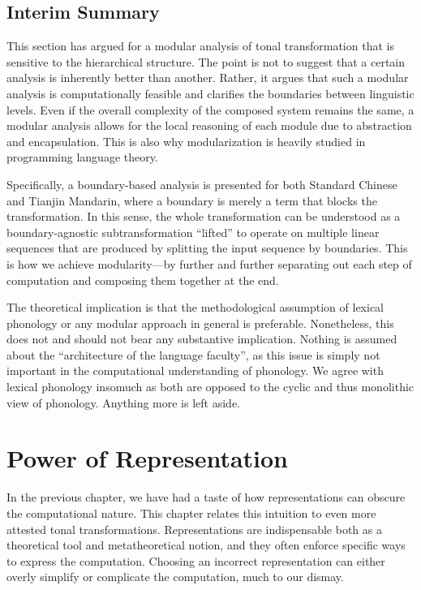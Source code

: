 \documentclass[12pt, a4paper]{report}
\begin{document}
\section{Interim Summary}
This section has argued for a modular analysis of tonal transformation
that is sensitive to the hierarchical structure.  The point is not to
suggest that a certain analysis is inherently better than another.
Rather, it argues that such a modular analysis is computationally
feasible and clarifies the boundaries between linguistic levels.  Even
if the overall complexity of the composed system remains the same, a
modular analysis allows for the local reasoning of each module due to
abstraction and encapsulation.  This is also why modularization is
heavily studied in programming language theory.

Specifically, a boundary-based analysis is presented for both Standard
Chinese and Tianjin Mandarin, where a boundary is merely a term that
blocks the transformation.  In this sense, the whole transformation
can be understood as a boundary-agnostic subtransformation
\enquote{lifted} to operate on multiple linear sequences that are
produced by splitting the input sequence by boundaries.  This is how we
achieve modularity---by further and further separating out each step
of computation and composing them together at the end.

The theoretical implication is that the methodological assumption of
lexical phonology or any modular approach in general is preferable.
Nonetheless, this does not and should not bear any substantive
implication.  Nothing is assumed about the \enquote{architecture of
  the language faculty}, as this issue is simply not important in the
computational understanding of phonology.  We agree with lexical
phonology insomuch as both are opposed to the cyclic and thus
monolithic view of phonology.  Anything more is left aside.

\chapter{Power of Representation}
In the previous chapter, we have had a taste of how representations
can obscure the computational nature.  This chapter relates this
intuition to even more attested tonal transformations.
Representations are indispensable both as a theoretical tool and
metatheoretical notion, and they often enforce specific ways to
express the computation.  Choosing an incorrect representation can
either overly simplify or complicate the computation, much to our
dismay.
\end{document}
